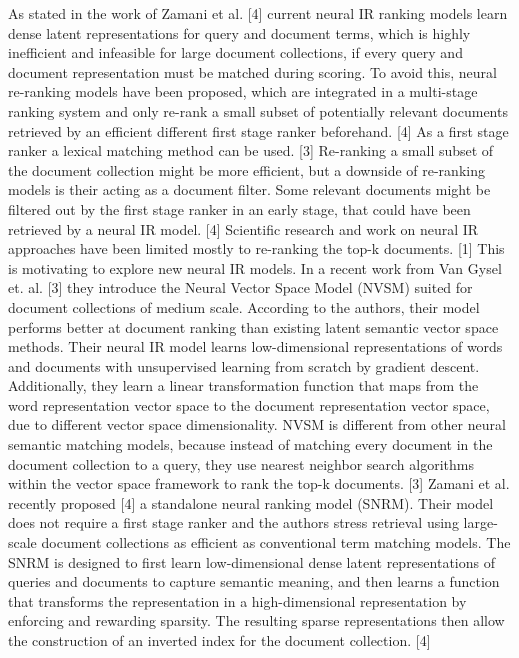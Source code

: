 As stated in the work of Zamani et al. [4] current neural IR ranking models learn dense latent representations for query and document terms, which is highly inefficient and infeasible for large document collections, if every query and document representation must be matched during scoring.
To avoid this, neural re-ranking models have been proposed, which are integrated in a multi-stage ranking system and only re-rank a small subset of potentially relevant documents retrieved by an efficient different first stage ranker beforehand. [4] 
As a first stage ranker a lexical matching method can be used. [3] 
Re-ranking a small subset of the document collection might be more efficient, but a downside of re-ranking models is their acting as a document filter.
Some relevant documents might be filtered out by the first stage ranker in an early stage, that could have been retrieved by a neural IR model. [4]
Scientific research and work on neural IR approaches have been limited mostly to re-ranking the top-k documents. [1]
This is motivating to explore new neural IR models.
In a recent work from Van Gysel et. al. [3] they introduce the Neural Vector Space Model (NVSM) suited for document collections of medium scale.
According to the authors, their model performs better at document ranking than existing latent semantic vector space methods.
Their neural IR model learns low-dimensional representations of words and documents with unsupervised learning from scratch by gradient descent.
Additionally, they learn a linear transformation function that maps from the word representation vector space to the document representation vector space, due to different vector space dimensionality.
NVSM is different from other neural semantic matching models, because instead of matching every document in the document collection to a query, they use nearest neighbor search algorithms within the vector space framework to rank the top-k documents. [3]
Zamani et al. recently proposed [4] a standalone neural ranking model (SNRM).
Their model does not require a first stage ranker and the authors stress retrieval using large-scale document collections as efficient as conventional term matching models.
The SNRM is designed to first learn low-dimensional dense latent representations of queries and documents to capture semantic meaning, and then learns a function that transforms the representation in a high-dimensional representation by enforcing and rewarding sparsity.
The resulting sparse representations then allow the construction of an inverted index for the document collection. [4]
